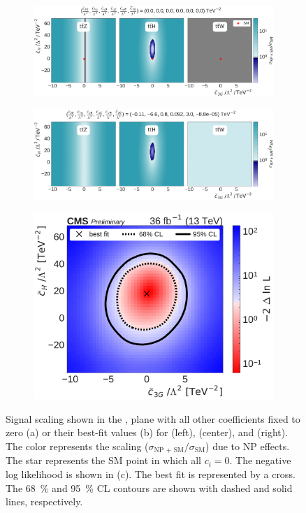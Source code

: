 \begin{figure}
  \vspace{-1cm}
  \begin{subfigure}{\linewidth}
    \centering
    \includegraphics[width=\linewidth]{figures/thirteen-TeV/scaling-frozen/c3G_cH}
    \caption{}
  \end{subfigure}
  \begin{subfigure}{\linewidth}
    \centering
    \includegraphics[width=\linewidth]{figures/thirteen-TeV/scaling/c3G_cH}
    \caption{}
  \end{subfigure}
  \begin{subfigure}{\linewidth}
    \centering
    \includegraphics[width=0.6\linewidth]{figures/thirteen-TeV/nll/c3G_cH}
    \caption{}
  \end{subfigure}
  \vspace{-1cm}
  \setlength{\capwidth}{15cm}
  \caption[Signal scaling and profile likelihood scan in the \cH, \cthreeG plane]{Signal scaling
  shown in the \cH, \cthreeG plane with all other coefficients fixed to zero (a) or their best-fit
  values (b) for \ttZ (left), \ttH (center), and \ttW (right). The color represents the scaling
  ($\sigma_\text{NP + SM} / \sigma_\text{SM}$) due to NP effects. The star represents the SM point in
  which all $c_i=0$. The negative log likelihood is shown in (c). The best fit is represented by a
  cross. The \SI{68}{\percent} and \SI{95}{\percent} CL contours are shown with dashed and solid
  lines, respectively.}
\end{figure}

